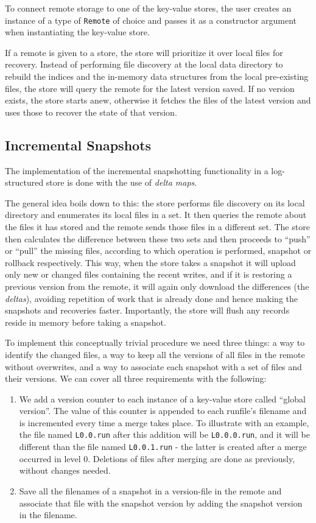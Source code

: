 To connect remote storage to one of the key-value stores, the user creates an instance of a type of \verb|Remote| of choice and passes it as a constructor argument when instantiating the key-value store.

If a remote is given to a store, the store will prioritize it over local files for recovery. Instead of performing file discovery at the local data directory to rebuild the indices and the in-memory data structures from the local pre-existing files, the store will query the remote for the latest version saved. If no version exists, the store starts anew, otherwise it fetches the files of the latest version and uses those to recover the state of that version.

\subsection{Incremental Snapshots}

The implementation of the incremental snapshotting functionality in a log-structured store is done with the use of \textit{delta maps}.

The general idea boils down to this: the store performs file discovery on its local directory and enumerates its local files in a set. It then queries the remote about the files it has stored and the remote sends those files in a different set. The store then calculates the difference between these two sets and then proceeds to ``push'' or ``pull'' the missing files, according to which operation is performed, snapshot or rollback respectively. This way, when the store takes a snapshot it will upload only new or changed files containing the recent writes, and if it is restoring a previous version from the remote, it will again only download the differences (the \textit{deltas}), avoiding repetition of work that is already done and hence making the snapshots and recoveries faster. Importantly, the store will flush any records reside in memory before taking a snapshot.

To implement this conceptually trivial procedure we need three things: a way to identify the changed files, a way to keep all the versions of all files in the remote without overwrites, and a way to associate each snapshot with a set of files and their versions. We can cover all three requirements with the following:

\begin{enumerate}
    \item We add a version counter to each instance of a key-value store called ``global version''. The value of this counter is appended to each runfile's filename and is incremented every time a merge takes place. To illustrate with an example, the file named \verb|L0.0.run| after this addition will be \verb|L0.0.0.run|, and it will be different than the file named \verb|L0.0.1.run| - the latter is created after a merge occurred in level 0. Deletions of files after merging are done as previously, without changes needed.
    \item Save all the filenames of a snapshot in a version-file in the remote and associate that file with the snapshot version by adding the snapshot version in the filename.
\end{enumerate}

